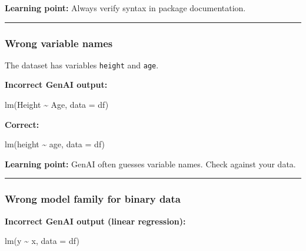 \documentclass[
  letterpaper,
  8pt,
  a4paper]{book}
\newenvironment{Shaded}{\begin{snugshade}}{\end{snugshade}}
\newcommand{\AttributeTok}[1]{\textcolor[rgb]{0.40,0.45,0.13}{#1}}
\newcommand{\FunctionTok}[1]{\textcolor[rgb]{0.28,0.35,0.67}{#1}}
\newcommand{\NormalTok}[1]{\textcolor[rgb]{0.00,0.23,0.31}{#1}}
\newcommand{\SpecialCharTok}[1]{\textcolor[rgb]{0.37,0.37,0.37}{#1}}
\begin{document}
\textbf{Learning point:} Always verify syntax in package documentation.

\begin{center}\rule{0.5\linewidth}{0.5pt}\end{center}

\subsubsection*{Wrong variable names}\label{wrong-variable-names}

The dataset has variables \texttt{height} and \texttt{age}.

\textbf{Incorrect GenAI output:}

\begin{Shaded}
\begin{Highlighting}[]
\FunctionTok{lm}\NormalTok{(Height }\SpecialCharTok{\textasciitilde{}}\NormalTok{ Age, }\AttributeTok{data =}\NormalTok{ df)}
\end{Highlighting}
\end{Shaded}

\textbf{Correct:}

\begin{Shaded}
\begin{Highlighting}[]
\FunctionTok{lm}\NormalTok{(height }\SpecialCharTok{\textasciitilde{}}\NormalTok{ age, }\AttributeTok{data =}\NormalTok{ df)}
\end{Highlighting}
\end{Shaded}

\textbf{Learning point:} GenAI often guesses variable names. Check
against your data.

\begin{center}\rule{0.5\linewidth}{0.5pt}\end{center}

\subsubsection*{Wrong model family for binary
data}\label{wrong-model-family-for-binary-data}

\textbf{Incorrect GenAI output (linear regression):}

\begin{Shaded}
\begin{Highlighting}[]
\FunctionTok{lm}\NormalTok{(y }\SpecialCharTok{\textasciitilde{}}\NormalTok{ x, }\AttributeTok{data =}\NormalTok{ df)}
\end{Highlighting}
\end{Shaded}
\end{document}
